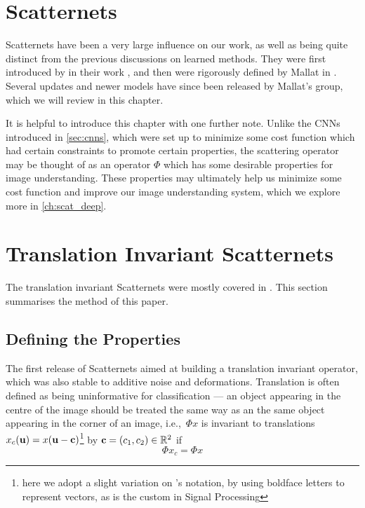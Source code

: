 \section{Scatternets}\label{ch:scatternets}

  Scatternets have been a very large influence on
  our work, as well as being quite distinct from the previous discussions on
  learned methods. They were first introduced by  
  \citeauthor{bruna_classification_2011} in their work 
  \citep{bruna_classification_2011}, and then were rigorously defined by Mallat
  in \citep{mallat_group_2012}. Several updates and newer models have since
  been released by Mallat's group, which we will review in this chapter.
  
  It is helpful to introduce this chapter with one further note. Unlike the
  CNNs introduced in \autoref{sec:cnns}, which were set up to minimize some
  cost function which had certain constraints to promote certain properties,
  the scattering operator may be thought of as an operator $\Phi$ which has
  some desirable properties for image understanding. These properties may
  ultimately help us minimize some cost function and improve our image
  understanding system, which we explore more in
  \autoref{ch:scat_deep}.


  \section{Translation Invariant Scatternets}
  The translation invariant Scatternets were mostly covered in
  \citep{bruna_invariant_2013}. This section summarises the method of this
  paper.

  \subsection{Defining the Properties}
  The first release of Scatternets aimed at building a translation invariant
  operator, which was also stable to additive noise and deformations. Translation
  is often defined as being uninformative for classification --- an object
  appearing in the centre of the image should be treated the same way as an
  the same object appearing in the corner of an image, i.e.,\ $\Phi x$ is
  invariant to translations $x_c(\mathbf{u}) = x(\mathbf{u}-\mathbf{c})$\footnote{here
  we adopt a slight variation on \Bruna's notation, by using boldface letters to
  represent vectors, as is the custom in Signal Processing} by 
  $\mathbf{c}=(c_1,c_2) \in \mathbb{R}^2$ if
  \begin{equation}\label{eq:scat_trans_invariance}
    \Phi x_c = \Phi x
  \end{equation}

